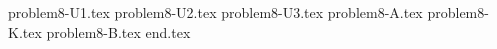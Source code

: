 \documentclass{../../../../style/mkimain}
\begin{document}
{problem8-U1.tex}
{problem8-U2.tex}
{problem8-U3.tex}
{problem8-A.tex}
{problem8-K.tex}
{problem8-B.tex}
{end.tex}
\end{document}
